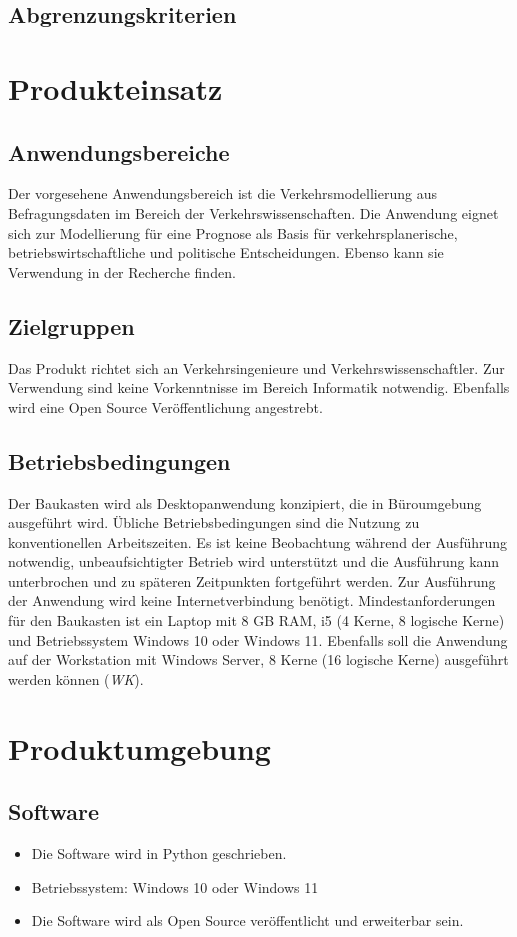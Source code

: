 \documentclass{article}
\begin{document}
\subsection{Abgrenzungskriterien}

\newpage
\section{Produkteinsatz}
\subsection{Anwendungsbereiche}
Der vorgesehene Anwendungsbereich ist die Verkehrsmodellierung aus Befragungsdaten im Bereich der Verkehrswissenschaften. Die Anwendung eignet sich zur Modellierung für eine Prognose als Basis für verkehrsplanerische, betriebswirtschaftliche und politische Entscheidungen. Ebenso kann sie Verwendung in der Recherche finden.

\subsection{Zielgruppen}
Das Produkt richtet sich an Verkehrsingenieure und Verkehrswissenschaftler. Zur Verwendung sind keine Vorkenntnisse im Bereich Informatik notwendig. Ebenfalls wird eine Open Source Veröffentlichung angestrebt.
  
\subsection{Betriebsbedingungen}
Der Baukasten wird als Desktopanwendung konzipiert, die in Büroumgebung ausgeführt wird. Übliche Betriebsbedingungen sind die Nutzung zu konventionellen Arbeitszeiten. Es ist keine Beobachtung während der Ausführung notwendig, unbeaufsichtigter Betrieb wird unterstützt und die Ausführung kann unterbrochen und zu späteren Zeitpunkten fortgeführt werden. Zur Ausführung der Anwendung wird keine Internetverbindung benötigt.
Mindestanforderungen für den Baukasten ist ein Laptop mit 8 GB RAM, i5 (4 Kerne, 8 logische Kerne) und Betriebssystem Windows 10 oder Windows 11. Ebenfalls soll die Anwendung auf der Workstation mit Windows Server, 8 Kerne (16 logische Kerne) ausgeführt werden können (\textit{WK}).
\newpage

\section{Produktumgebung}
\subsection{Software}
\begin{itemize}
    \item Die Software wird in Python geschrieben.
    \item Betriebssystem: Windows 10 oder Windows 11
    \item Die Software wird als Open Source veröffentlicht und erweiterbar sein.
\end{itemize}
\end{document}
